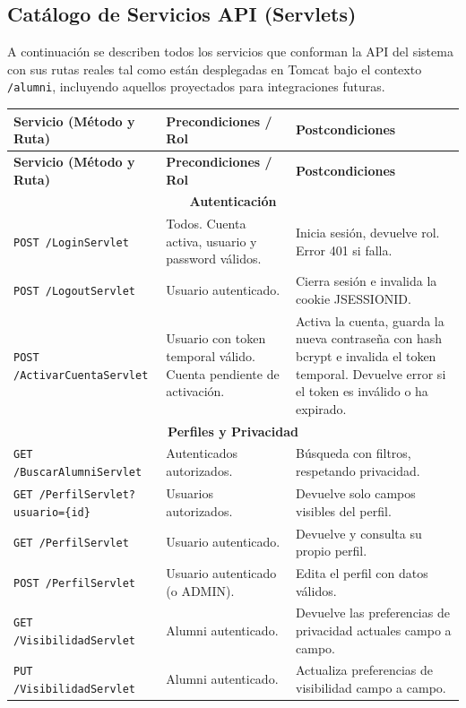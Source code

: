 \documentclass{report}
\begin{document}
\subsection{Catálogo de Servicios API (Servlets)}
A continuación se describen todos los servicios que conforman la API del sistema con sus rutas reales tal como están desplegadas en Tomcat bajo el contexto \texttt{/alumni}, incluyendo aquellos proyectados para integraciones futuras.
\begin{longtable}{|p{}|p{}|p{}|}
\hline
\textbf{Servicio (Método y Ruta)} & \textbf{Precondiciones / Rol} & \textbf{Postcondiciones} \\ \hline
\endfirsthead
\hline
\textbf{Servicio (Método y Ruta)} & \textbf{Precondiciones / Rol} & \textbf{Postcondiciones} \\ \hline
\endhead
\multicolumn{3}{|c|}{\textbf{Autenticación}} \\ \hline
\texttt{POST /LoginServlet} & Todos. Cuenta activa, usuario y password válidos. & Inicia sesión, devuelve rol. Error 401 si falla. \\ \hline
\texttt{POST /LogoutServlet} & Usuario autenticado. & Cierra sesión e invalida la cookie JSESSIONID. \\ \hline
\texttt{POST /ActivarCuentaServlet} & Usuario con token temporal válido. Cuenta pendiente de activación. & Activa la cuenta, guarda la nueva contraseña con hash bcrypt e invalida el token temporal. Devuelve error si el token es inválido o ha expirado. \\ \hline
\multicolumn{3}{|c|}{\textbf{Perfiles y Privacidad}} \\ \hline
\texttt{GET /BuscarAlumniServlet} & Autenticados autorizados. & Búsqueda con filtros, respetando privacidad. \\ \hline
\texttt{GET /PerfilServlet?usuario=\{id\}} & Usuarios autorizados. & Devuelve solo campos visibles del perfil. \\ \hline
\texttt{GET /PerfilServlet} & Usuario autenticado. & Devuelve y consulta su propio perfil. \\ \hline
\texttt{POST /PerfilServlet} & Usuario autenticado (o ADMIN). & Edita el perfil con datos válidos. \\ \hline
\texttt{GET /VisibilidadServlet} & Alumni autenticado. & Devuelve las preferencias de privacidad actuales campo a campo. \\ \hline
\texttt{PUT /VisibilidadServlet} & Alumni autenticado. & Actualiza preferencias de visibilidad campo a campo. \\ \hline

\end{longtable}
\end{document}
